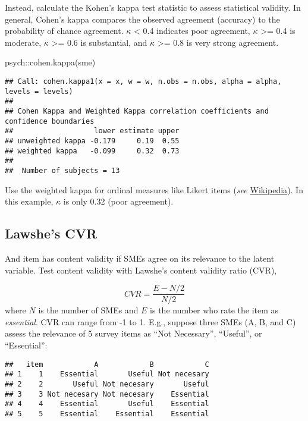 \documentclass[
]{book}
\newenvironment{Shaded}{\begin{snugshade}}{\end{snugshade}}
\newcommand{\FunctionTok}[1]{\textcolor[rgb]{0.00,0.00,0.00}{#1}}
\newcommand{\NormalTok}[1]{#1}
\newcommand{\SpecialCharTok}[1]{\textcolor[rgb]{0.00,0.00,0.00}{#1}}
\theoremstyle{definition}
\theoremstyle{definition}
\theoremstyle{definition}
\theoremstyle{definition}
\theoremstyle{remark}
\begin{document}
Instead, calculate the Kohen's kappa test statistic to assess statistical validity. In general, Cohen's kappa compares the observed agreement (accuracy) to the probability of chance agreement. \(\kappa\) \textless{} 0.4 indicates poor agreement, \(\kappa\) \textgreater= 0.4 is moderate, \(\kappa\) \textgreater= 0.6 is substantial, and \(\kappa\) \textgreater= 0.8 is very strong agreement.

\begin{Shaded}
\begin{Highlighting}[]
\NormalTok{psych}\SpecialCharTok{::}\FunctionTok{cohen.kappa}\NormalTok{(sme)}
\end{Highlighting}
\end{Shaded}

\begin{verbatim}
## Call: cohen.kappa1(x = x, w = w, n.obs = n.obs, alpha = alpha, levels = levels)
## 
## Cohen Kappa and Weighted Kappa correlation coefficients and confidence boundaries 
##                   lower estimate upper
## unweighted kappa -0.179     0.19  0.55
## weighted kappa   -0.099     0.32  0.73
## 
##  Number of subjects = 13
\end{verbatim}

Use the weighted kappa for ordinal measures like Likert items (\emph{see} \href{https://en.wikipedia.org/wiki/Cohen\%27s_kappa}{Wikipedia}). In this example, \(\kappa\) is only 0.32 (poor agreement).

\hypertarget{lawshes-cvr}{%
\subsection{Lawshe's CVR}\label{lawshes-cvr}}

And item has content validity if SMEs agree on its relevance to the latent variable. Test content validity with Lawshe's content validity ratio (CVR),

\[CVR = \frac{E - N/2}{N/2}\]
where \(N\) is the number of SMEs and \(E\) is the number who rate the item as \emph{essential}. CVR can range from -1 to 1. E.g., suppose three SMEs (A, B, and C) assess the relevance of 5 survey items as ``Not Necessary'', ``Useful'', or ``Essential'':

\begin{verbatim}
##   item            A            B            C
## 1    1    Essential       Useful Not necesary
## 2    2       Useful Not necesary       Useful
## 3    3 Not necesary Not necesary    Essential
## 4    4    Essential       Useful    Essential
## 5    5    Essential    Essential    Essential
\end{verbatim}
\end{document}

